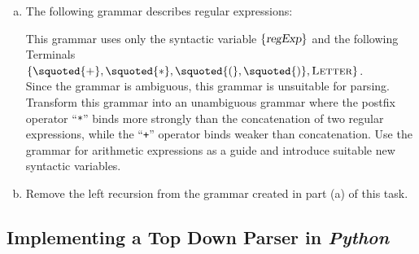 \exerciseEng \label{exercise:regexp}
\begin{enumerate}[(a)]
\item The following grammar describes regular expressions:
      \begin{center}    
      \end{center}
      This grammar uses only the syntactic variable $\{ \textsl{regExp} \}$ and the following 
      Terminals
      \\[0.2cm]
      \hspace*{1.3cm}
      $\{\squoted{+}, \squoted{*}, \squoted{(}, \squoted{)}, \textsc{Letter}\}$.
      \\[0.2cm]
      Since the grammar is ambiguous, this grammar is unsuitable for parsing.
      Transform this grammar into an unambiguous grammar where the
      postfix operator ``\texttt{*}'' binds more strongly than the concatenation of two regular
      expressions, while the ``\texttt{+}'' operator binds weaker than concatenation. 
      Use the grammar for arithmetic expressions as a guide and introduce suitable new syntactic
      variables.
\item Remove the left recursion from the grammar created in part (a) of this task.
      \eox
\end{enumerate}


\subsection{Implementing a Top Down Parser in \textsl{Python}}


